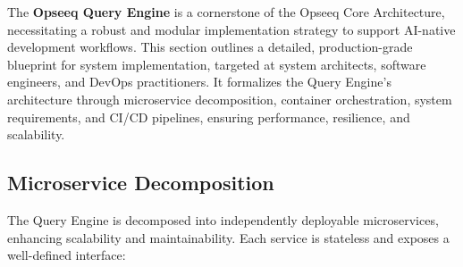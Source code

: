 \documentclass[11pt]{article}
\begin{document}
The \textbf{Opseeq Query Engine} is a cornerstone of the Opseeq Core Architecture, necessitating a robust and modular implementation strategy to support AI-native development workflows. This section outlines a detailed, production-grade blueprint for system implementation, targeted at system architects, software engineers, and DevOps practitioners. It formalizes the Query Engine’s architecture through microservice decomposition, container orchestration, system requirements, and CI/CD pipelines, ensuring performance, resilience, and scalability.

\subsection{Microservice Decomposition}
\label{subsec:microservices}

The Query Engine is decomposed into independently deployable microservices, enhancing scalability and maintainability. Each service is stateless and exposes a well-defined interface:
\end{document}
